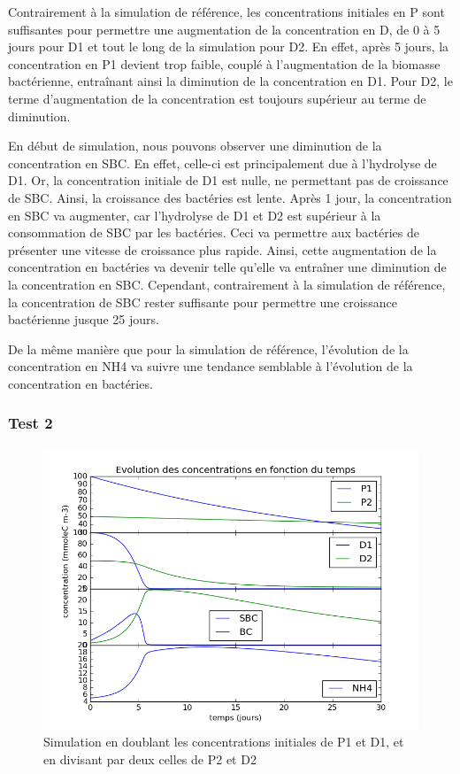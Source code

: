 \par{
Contrairement \`a la simulation de r\'ef\'erence, les concentrations initiales en P sont suffisantes pour permettre une augmentation de la concentration en D, de 0 \`a 5 jours pour D1 et tout le long de la simulation pour D2. En effet, apr\`es 5 jours, la concentration en P1 devient trop faible, coupl\'e \`a l'augmentation de la biomasse bact\'erienne, entra\^inant ainsi la diminution de la concentration en D1. Pour D2, le terme d'augmentation de la concentration est toujours sup\'erieur au terme de diminution.
}
\par{
En d\'ebut de simulation, nous pouvons observer une diminution de la concentration en SBC. En effet, celle-ci est principalement due \`a l'hydrolyse de D1. Or, la concentration initiale de D1 est nulle, ne permettant pas de croissance de SBC. Ainsi, la croissance des bact\'eries est lente. Apr\`es 1 jour, la concentration en SBC va augmenter, car l'hydrolyse de D1 et D2 est sup\'erieur \`a la consommation de SBC par les bact\'eries. Ceci va permettre aux bact\'eries de pr\'esenter une vitesse de croissance plus rapide. Ainsi, cette augmentation de la concentration en bact\'eries va devenir telle qu'elle va entra\^iner une diminution de la concentration en SBC. Cependant, contrairement \`a la simulation de r\'ef\'erence, la concentration de SBC rester suffisante pour permettre une croissance bact\'erienne jusque 25 jours.
}
\par{
De la m\^eme mani\`ere que pour la simulation de r\'ef\'erence, l'\'evolution de la concentration en NH4 va suivre une tendance semblable \`a l'\'evolution de la concentration en bact\'eries.
}

\FloatBarrier
\subsubsection{Test 2}

\begin{figure}[h!]
  \includegraphics[width=\textwidth]{partie2/Test2.png}
  \caption{Simulation en doublant les concentrations initiales de P1 et D1, et en divisant par deux celles de P2 et D2
  }
  \label{fig:partie2test2}
\end{figure}

